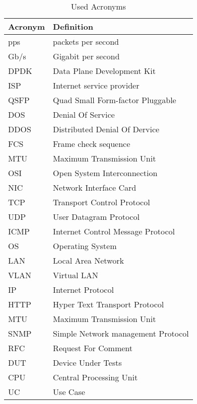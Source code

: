\begin{table}[]
\centering
\caption{Used Acronyms}
\label{table:acronyms}
\begin{tabular}{l|l}
\hline
\textbf{Acronym}                  & \textbf{Definition}  \\ \hline
pps & packets per second \\ \hline 
Gb/s & Gigabit per second \\ \hline
DPDK & Data Plane Development Kit \\ \hline
ISP & Internet service provider \\ \hline
QSFP & Quad Small Form-factor Pluggable \\ \hline
DOS & Denial Of Service \\ \hline
DDOS & Distributed Denial Of Dervice \\ \hline
FCS & Frame check sequence \\ \hline
MTU & Maximum Transmission Unit \\ \hline
OSI & Open System Interconnection \\ \hline
NIC & Network Interface Card \\ \hline
TCP & Transport Control Protocol \\ \hline
UDP & User Datagram Protocol \\ \hline
ICMP & Internet Control Message Protocol \\ \hline
OS & Operating System \\ \hline
LAN & Local Area Network \\ \hline
VLAN & Virtual LAN \\ \hline
IP & Internet Protocol \\ \hline
HTTP & Hyper Text Transport Protocol \\ \hline
MTU & Maximum Transmission Unit \\ \hline
SNMP & Simple Network management Protocol \\ \hline
RFC & Request For Comment \\ \hline
DUT & Device Under Tests \\ \hline
CPU & Central Processing Unit \\ \hline
UC & Use Case \\ \hline
\end{tabular}
\end{table}

